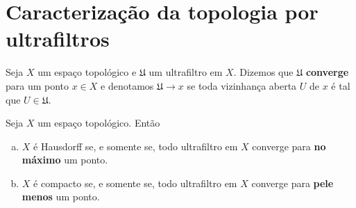 \section{Caracterização da topologia por ultrafiltros}
\label{sec:topol_filtros}

 Seja 
 $X$
 um espaço topológico e 
 $\mathfrak{U}$
 um ultrafiltro em 
 $X$.
 Dizemos que 
 $\mathfrak{U}$
 \textbf{converge} para um ponto
 $x \in X$
 e denotamos
 $\mathfrak{U} \to x$
 se toda vizinhança aberta
 $U$
 de
 $x$
 é tal que
 $U \in \mathfrak{U}$.
 
 \begin{theorem}
 \label{teo:2.1}
 Seja
 $X$
 um espaço topológico.
 Então
 \begin{enumerate}[(a)]
    \item $X$ é Hausdorff se, e somente se, 
    todo ultrafiltro em $X$ converge para \textbf{no máximo} um ponto.
    \item $X$ é compacto se, e somente se, 
    todo ultrafiltro em $X$ converge para \textbf{pele menos} um ponto.
 \end{enumerate}
 \end{theorem}

